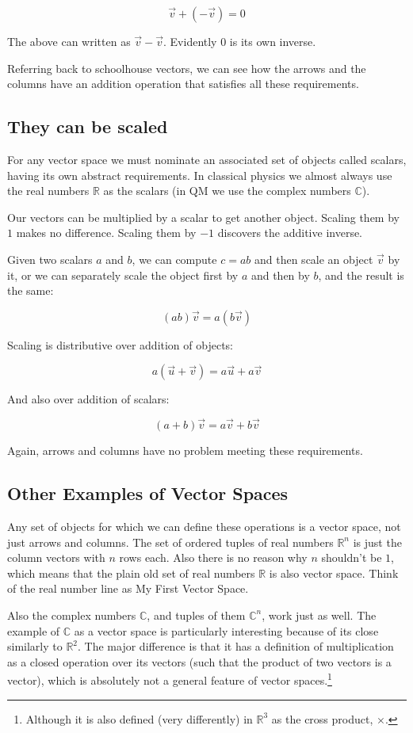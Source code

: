 $$\vec{v} + (-\vec{v}) = 0$$

The above can written as $\vec{v} - \vec{v}$. Evidently $0$ is its own inverse.

Referring back to schoolhouse vectors, we can see how the arrows and the columns have an addition operation that satisfies all these requirements.

\subsection{They can be scaled}

For any vector space we must nominate an associated set of objects called scalars, having its own abstract requirements. In classical physics we almost always use the real numbers $\mathbb{R}$ as the scalars (in QM we use the complex numbers $\mathbb{C}$).

Our vectors can be multiplied by a scalar to get another object. Scaling them by $1$ makes no difference. Scaling them by $-1$ discovers the additive inverse.

Given two scalars $a$ and $b$, we can compute $c = ab$ and then scale an object $\vec{v}$ by it, or we can separately scale the object first by $a$ and then by $b$, and the result is the same:

$$(ab)\vec{v} = a(b\vec{v})$$

Scaling is distributive over addition of objects:

$$a(\vec{u} + \vec{v}) = a\vec{u} + a\vec{v}$$

And also over addition of scalars:

$$(a + b)\vec{v} = a\vec{v} + b\vec{v}$$

Again, arrows and columns have no problem meeting these requirements.

\subsection{Other Examples of Vector Spaces}

Any set of objects for which we can define these operations is a vector space, not just arrows and columns. The set of ordered tuples of real numbers $\mathbb{R}^n$ is just the column vectors with $n$ rows each. Also there is no reason why $n$ shouldn't be $1$, which means that the plain old set of real numbers $\mathbb{R}$ is also vector space. Think of the real number line as My First Vector Space\texttrademark.

Also the complex numbers $\mathbb{C}$, and tuples of them $\mathbb{C}^n$, work just as well. The example of $\mathbb{C}$ as a vector space is particularly interesting because of its close similarly to $\mathbb{R}^2$. The major difference is that it has a definition of multiplication as a closed operation over its vectors (such that the product of two vectors is a vector), which is absolutely not a general feature of vector spaces.\footnote{Although it is also defined (very differently) in $\mathbb{R}^3$ as the cross product, $\times$.}

